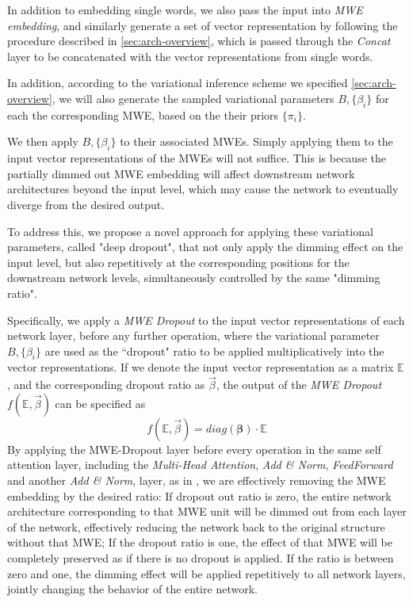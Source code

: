 In addition to embedding single words, 
we also pass the input into \textit{MWE embedding}, and similarly generate a set of vector representation 
by following the procedure described in  \autoref{sec:arch-overview}, which is passed through the \textit{Concat} layer to be 
concatenated with the vector representations from single words.

In addition, according to the variational inference scheme we specified \autoref{sec:arch-overview}, 
we will also generate the 
sampled variational parameters $B, \{\beta_i\}$ for each the corresponding MWE, based on the their priors $\{\pi_i \}$. 

We then apply $B, \{\beta_i\}$ to their associated MWEs. Simply applying them to the input vector representations of the MWEs will not suffice. 
This is because 
the partially dimmed out MWE embedding will affect downstream network architectures beyond the input level, which may cause the network to eventually diverge from the desired output.



To address this, we propose a novel approach for applying these variational parameters, called "deep dropout", that not only apply the dimming effect on the input level, but also repetitively 
at the corresponding positions for the downstream network levels, simultaneously controlled by the same "dimming ratio".

Specifically, we apply a \textit{MWE Dropout} to 
the input vector representations of each network layer, before any further operation, where the variational parameter $B, \{\beta_i\}$ are used as 
the ``dropout" ratio to be applied multiplicatively into the vector representations.
If we denote the input vector representation as a matrix $\mathbb{E}$, and the corresponding dropout ratio as $\vec{\beta}$, 
the output of the \textit{MWE Dropout} $f(\mathbb{E}, \vec{\beta})$ can be specified as 
\begin{equation} \label{eq:MWEDropout}
   f(\mathbb{E}, \vec{\beta}) =  diag(\bm{\beta}) \cdot \mathbb{E}
\end{equation}
By applying the MWE-Dropout layer before every operation in the same self attention layer, including the 
\textit{Multi-Head Attention}, \textit{Add & Norm}, \textit{FeedForward} and another \textit{Add & Norm}, layer, as in \cite{vaswani2017attention}, 
we are effectively removing the MWE embedding by the  desired ratio:
If dropout out ratio is zero, the entire network architecture corresponding to that MWE unit will be dimmed out from each layer of the network,
effectively reducing the network back to the original structure without that MWE;
If the dropout ratio is one, the effect of that MWE will be completely preserved as if there is no dropout is applied.
If the ratio is between zero and one, 
the dimming effect will be applied repetitively to all network layers, jointly changing the behavior of the entire network.

